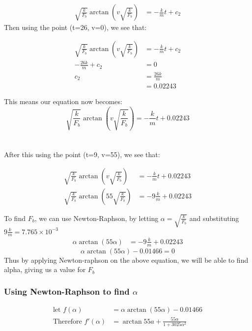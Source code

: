 \begin{align*}
    \sqrt{\frac{k}{F_b}} \arctan{(v\sqrt{\frac{k}{F_b}})} &= -\frac{k}{m}t + c_2
\end{align*}
Then using the point (t=26, v=0), we see that:
\begin{center}
\begin{align*}
    \sqrt{\frac{k}{F_b}} \arctan{(v\sqrt{\frac{k}{F_b}})} &= -\frac{k}{m}t + c_2
    \\ -\frac{26k}{m} + c_2 &= 0
    \\ c_2 &= \frac{26k}{m} 
    \\ &= 0.02243
\end{align*}
\end{center}
This means our equation now becomes:
\begin{equation}
    \sqrt{\frac{k}{F_b}} \arctan{(v\sqrt{\frac{k}{F_b}})} = -\frac{k}{m}t + 0.02243
\end{equation}
\\ \\
After this using the point (t=9, v=55), we see that:
\\
\begin{center}
\begin{align*}
    \sqrt{\frac{k}{F_b}} \arctan{(v\sqrt{\frac{k}{F_b}})} &= -\frac{k}{m}t + 0.02243
    \\ \sqrt{\frac{k}{F_b}} \arctan{(55\sqrt{\frac{k}{F_b}})} &= -9\frac{k}{m} + 0.02243
\end{align*}
\end{center}
To find $F_b$, we can use Newton-Raphson, by letting $\alpha=\sqrt{\frac{k}{F_b}}$ and substituting $9 \frac{k}{m} = 7.765\times{10^{-3}}$
\begin{align*}
    \alpha \arctan{(55\alpha)} &= -9 \frac{k}{m} + 0.02243
\end{align*}
\begin{equation}
    \alpha \arctan{(55\alpha)} - 0.01466 = 0
\end{equation}
Thus by applying Newton-raphson on the above equation, we will be able to find alpha, giving us a value for $F_b$

\subsubsection{Using Newton-Raphson to find $\alpha$}
\begin{align*}
    \text{let } f(\alpha) &= \alpha \arctan{(55\alpha)} - 0.01466
    \\ \text{Therefore } f'(\alpha) &= \arctan{55a} + \frac{55\alpha}{1+3025\alpha^2}
\end{align*}

